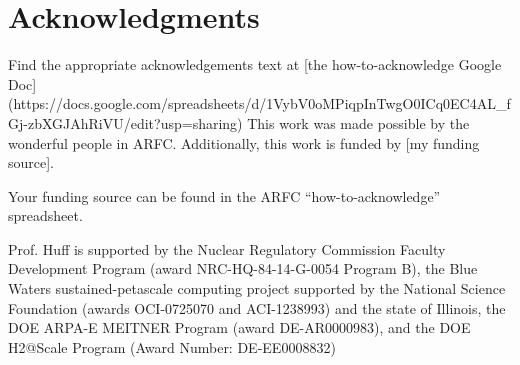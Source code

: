 \section{Acknowledgments}
Find the appropriate acknowledgements text at 
[the how-to-acknowledge Google Doc](https://docs.google.com/spreadsheets/d/1VybV0oMPiqpInTwgO0ICq0EC4AL_fGj-zbXGJAhRiVU/edit?usp=sharing)
This work was made possible by the wonderful people in ARFC. Additionally,
this work is funded by [my funding source].

Your funding source can be found in the ARFC ``how-to-acknowledge'' spreadsheet.

Prof. Huff is supported by the Nuclear Regulatory Commission Faculty
Development Program (award NRC-HQ-84-14-G-0054 Program B), the Blue Waters
sustained-petascale computing project supported by the National Science
Foundation (awards OCI-0725070 and ACI-1238993) and the state of Illinois, the
DOE ARPA-E MEITNER Program (award DE-AR0000983), and the DOE H2@Scale Program
(Award Number: DE-EE0008832)
